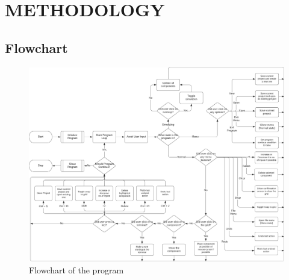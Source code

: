 \documentclass[report.tex]{subfiles}
\begin{document}
    \chapter{METHODOLOGY}
    \section{Flowchart}
    \begin{figure}[H]
        \centering
        \includegraphics[width=\textwidth]{graphics/Flowchart.png}
        \caption{Flowchart of the program}
    \end{figure}
\end{document}
